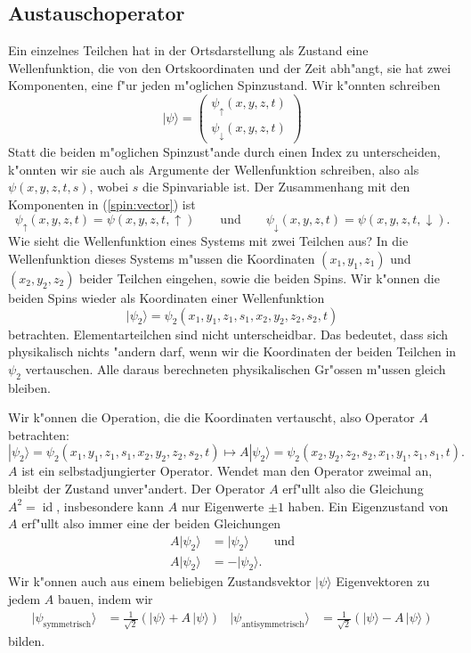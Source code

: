 \subsection{Austauschoperator\label{skript:austauschoperator}}
Ein einzelnes Teilchen hat in der Ortsdarstellung als Zustand
eine Wellenfunktion, die von den Ortskoordinaten und der Zeit abh"angt,
sie hat zwei Komponenten, eine f"ur jeden m"oglichen Spinzustand.
Wir k"onnten schreiben
\begin{equation}
|\psi\rangle
=
\begin{pmatrix}
\psi_\uparrow(x,y,z,t)\\
\psi_\downarrow(x,y,z,t)
\end{pmatrix}
\label{spin:vector}
\end{equation}
Statt die beiden m"oglichen Spinzust"ande durch einen Index zu unterscheiden,
k"onnten wir sie auch als Argumente der Wellenfunktion schreiben, also
als $\psi(x,y,z,t,s)$, wobei $s$ die Spinvariable ist. Der Zusammenhang
mit den Komponenten in (\ref{spin:vector}) ist
\[
\psi_\uparrow(x,y,z,t)
=
\psi(x,y,z,t,\uparrow)
\qquad\text{und}\qquad
\psi_\downarrow(x,y,z,t)
=
\psi(x,y,z,t,\downarrow).
\]
Wie sieht die Wellenfunktion eines Systems mit zwei Teilchen aus?
In die Wellenfunktion dieses Systems m"ussen die Koordinaten
$(x_1,y_1,z_1)$ und $(x_2,y_2,z_2)$ beider Teilchen eingehen, 
sowie die beiden Spins. Wir k"onnen die beiden Spins wieder als
Koordinaten einer Wellenfunktion
\[
|\psi_2\rangle
=
\psi_2(x_1,y_1,z_1,s_1,x_2,y_2,z_2,s_2,t)
\]
betrachten.
Elementarteilchen sind nicht unterscheidbar. Das bedeutet, dass sich
physikalisch nichts "andern darf, wenn wir die Koordinaten der beiden
Teilchen in $\psi_2$ vertauschen. Alle daraus berechneten physikalischen
Gr"ossen m"ussen gleich bleiben.

Wir k"onnen die Operation, die die Koordinaten vertauscht, also
Operator $A$ betrachten:
%
\[
|\psi_2\rangle
=
\psi_2(x_1,y_1,z_1,s_1,x_2,y_2,z_2,s_2,t)
\mapsto
A|\psi_2\rangle
=
\psi_2(x_2,y_2,z_2,s_2,x_1,y_1,z_1,s_1,t).
\]
$A$ ist ein selbstadjungierter Operator.
Wendet man den Operator zweimal an, bleibt der Zustand unver"andert.
Der Operator $A$ erf"ullt also die Gleichung $A^2=\operatorname{id}$,
insbesondere kann $A$ nur Eigenwerte $\pm 1$ haben.
Ein Eigenzustand von $A$ erf"ullt also immer eine der beiden 
Gleichungen
\begin{align*}
A|\psi_2\rangle &= |\psi_2\rangle\qquad\text{und}
\tag{symmetrisch}
\\
A|\psi_2\rangle &=-|\psi_2\rangle.
\tag{antisymmetrisch}
\end{align*}
%
%
Wir k"onnen auch aus einem beliebigen Zustandsvektor $|\psi\rangle$
Eigenvektoren zu jedem $A$ bauen, indem wir
\begin{align*}
|\psi_\text{symmetrisch}\rangle
&=
\frac1{\sqrt{2}}(|\psi\rangle + A\,|\psi\rangle)
&
|\psi_\text{antisymmetrisch}\rangle
&=
\frac1{\sqrt{2}}(|\psi\rangle - A\,|\psi\rangle)
\end{align*}
bilden.

